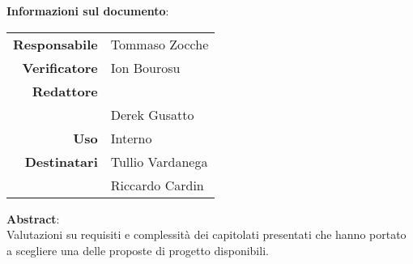 \begin{center}
\textbf{Informazioni sul documento}: \\
\vspace{0.5cm}

\begin{tabular}{r|l}
    \textbf{Responsabile} &  Tommaso Zocche\\ 
    \textbf{Verificatore} &  Ion Bourosu\\ 
    \textbf{Redattore} &     \\ 
     &  Derek Gusatto   \\ 
    \textbf{Uso} & Interno\\ 
    \textbf{Destinatari} & Tullio Vardanega \\ & Riccardo Cardin \\ 
\end{tabular}

\vfill

\textbf{Abstract}: \\
\vspace{0.5cm}
Valutazioni su requisiti e complessità dei capitolati presentati che hanno portato a scegliere una delle proposte di progetto disponibili.
\end{center}


\bigskip